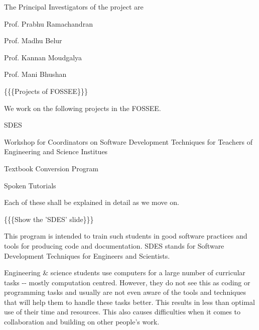 \documentclass[a4paper,english]{article}
\begin{document}
The Principal Investigators of the project are
\begin{list}{.}
{
\setlength{\rightmargin}{\leftmargin}
}

\item Prof. Prabhu Ramachandran

\item Prof. Madhu Belur

\item Prof. Kannan Moudgalya

\item Prof. Mani Bhushan
\end{list}


\{\{\{Projects of FOSSEE\}\}\}


We work on the following projects in the FOSSEE.
\setcounter{listcnt0}{0}
\begin{list}{.}
{
\setlength{\rightmargin}{\leftmargin}
}

\item SDES

\item Workshop for Coordinators on Software Development Techniques for Teachers of Engineering and Science Institues

\item Textbook Conversion Program

\item Spoken Tutorials
\end{list}

Each of these shall be explained in detail as we move on.


\{\{\{Show the 'SDES' slide\}\}\}


This program is intended to train such students in good software practices and tools for producing code and documentation. SDES stands for Software Development Techniques for Engineers and Scientists.

Engineering \& science students use computers for a large number of curricular tasks -{}- mostly computation centred. However, they do not see this as coding or programming tasks and usually are not even aware of the tools and techniques that will help them to handle these tasks better. This results in less than optimal use of their time and resources. This also causes difficulties when it comes to collaboration and building on other people's work.
\end{document}

